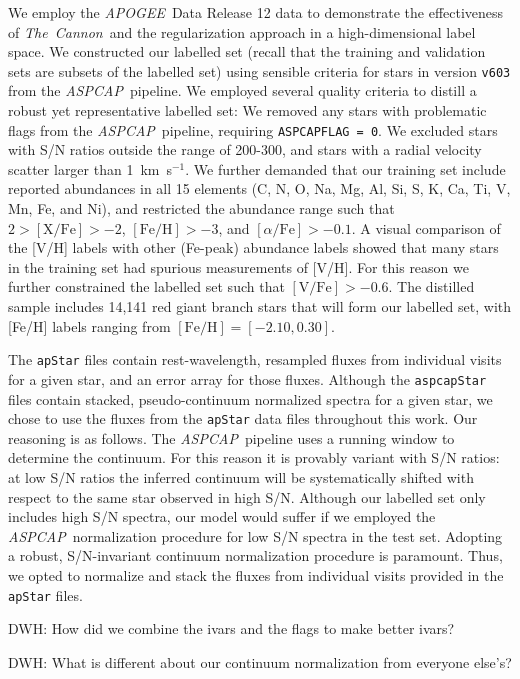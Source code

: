\documentclass[12pt,preprint]{aastex}
\newcommand{\project}[1]{\textsl{#1}}
\newcommand{\TheCannon}{\project{The~Cannon}}
\newcommand{\acronym}[1]{{\small{#1}}}
\newcommand{\apogee}{\project{\acronym{APOGEE}}}
\newcommand{\aspcap}{\project{\acronym{ASPCAP}}}
\begin{document}
We employ the \apogee\ Data Release 12 data to demonstrate the effectiveness
of \TheCannon\ and the regularization approach in a high-dimensional label space.
We constructed our labelled set (recall that the training and validation sets are subsets of the labelled set) using sensible criteria for  
stars in version \texttt{v603} from the \aspcap\ 
pipeline.
We employed several quality criteria to distill a robust yet representative 
labelled set: We removed any stars with problematic flags from the \aspcap\
pipeline, requiring \texttt{ASPCAPFLAG = 0}.  We excluded stars with 
S/N ratios outside the range of 200-300, and stars with a radial 
velocity scatter larger than 1~km~s$^{-1}$.  We further demanded that
our training set include reported abundances in all 15 elements (C, N, O, Na, 
Mg, Al, Si, S, K, Ca, Ti, V, Mn, Fe, and Ni), and restricted the abundance range
such that $2 > \mathrm{[X/Fe]} > -2$, $\mathrm{[Fe/H]} > -3$, and 
$[\alpha/\mathrm{Fe}] > -0.1$.  A visual comparison of the [V/H] labels
with other (Fe-peak) abundance labels showed that many stars in the training set had
spurious measurements of [V/H]. For this reason we further constrained the
labelled set such that $\mathrm{[V/Fe]} > -0.6$.  The distilled sample
includes 14,141 red giant branch stars that will form our labelled set, with [Fe/H] labels ranging from
$\mathrm{[Fe/H]} = [-2.10, 0.30]$. 


The \texttt{apStar} files contain rest-wavelength, resampled fluxes from
individual visits for a given star, and an error array for those fluxes.
Although the \texttt{aspcapStar} files contain stacked, pseudo-continuum normalized
spectra for a given star, we chose to use the fluxes from the \texttt{apStar}
data files throughout this work.  Our reasoning is as follows.  The \aspcap\
pipeline uses a running window to determine the continuum.  For this reason
it is provably variant with S/N ratios: at low S/N ratios the inferred continuum
will be systematically shifted with respect to the same star observed in high S/N.
Although our labelled set only includes high S/N spectra, our model would suffer
if we employed the \aspcap\ normalization procedure for low S/N spectra in the
test set.  Adopting a robust, S/N-invariant continuum normalization procedure
is paramount. Thus, we opted to normalize and stack the fluxes from individual
visits provided in the \texttt{apStar} files.


DWH: How did we combine the ivars and the flags to make better ivars?

DWH: What is different about our continuum normalization from everyone else's?
\end{document}
